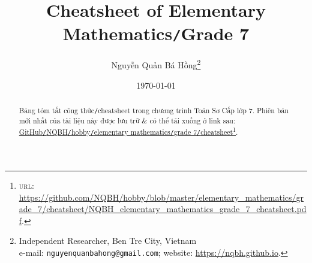 \documentclass{article}
\title{Cheatsheet of Elementary Mathematics\texttt{/}Grade 7}
\author{Nguyễn Quản Bá Hồng\footnote{Independent Researcher, Ben Tre City, Vietnam\\e-mail: \texttt{nguyenquanbahong@gmail.com}; website: \url{https://nqbh.github.io}.}}
\date{\today}
\numberwithin{equation}{section}
\begin{document}
\maketitle
\begin{abstract}
	Bảng tóm tắt công thức\texttt{/}cheatsheet trong chương trình Toán Sơ Cấp lớp 7. Phiên bản mới nhất của tài liệu này được lưu trữ \& có thể tải xuống ở link sau: \href{https://github.com/NQBH/hobby/blob/master/elementary_mathematics/grade_7/cheatsheet/NQBH_elementary_mathematics_grade_7_cheatsheet.pdf}{GitHub\texttt{/}NQBH\texttt{/}hobby\texttt{/}elementary mathematics\texttt{/}grade 7\texttt{/}cheatsheet}\footnote{\textsc{url}: \url{https://github.com/NQBH/hobby/blob/master/elementary_mathematics/grade_7/cheatsheet/NQBH_elementary_mathematics_grade_7_cheatsheet.pdf}.}.
\end{abstract}
\tableofcontents
\newpage

\end{document}
